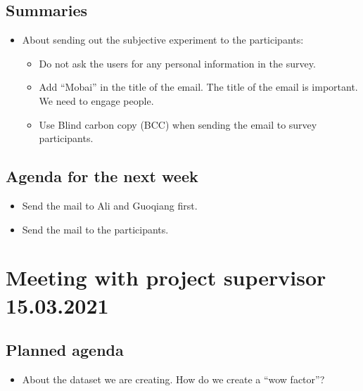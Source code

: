 \subsection*{Summaries}
\begin{itemize}
    \item About sending out the subjective experiment to the participants:
    \begin{itemize}
        \item Do not ask the users for any personal information in the survey.
        \item Add “Mobai” in the title of the email. The title of the email is important. We need to engage people.
        \item Use Blind carbon copy (BCC) when sending the email to survey participants.
    \end{itemize}
\end{itemize}

\subsection*{Agenda for the next week}
\begin{itemize}
    \item Send the mail to Ali and Guoqiang first.
    \item Send the mail to the participants.
\end{itemize}

\newpage

\section*{Meeting with project supervisor 15.03.2021}
\subsection*{Planned agenda}
\begin{itemize}
    \item About the dataset we are creating. How do we create a “wow factor”?
\end{itemize}

